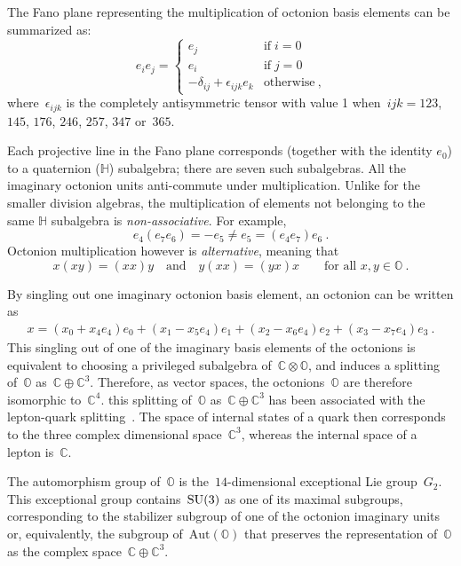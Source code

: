 \documentclass[reqno,11pt]{amsart}
\numberwithin{equation}{section}
\newcommand{\C}{\mathbb{C}}
\newcommand{\1}{\mbox{\rm 1 \hspace{-1.05 em} 1}}
\newcommand{\SU}{{\rm{SU}}}
\newcommand{\bb}[1]{\mathbb{#1}}
\begin{document}
\noindent
The Fano plane representing the multiplication of octonion basis elements can be summarized as:
\[ e_ie_j= \left\{ \begin{array}{cl}
        e_j&\textrm{if}\;i=0\\
        e_i&\textrm{if}\;j=0\\
        -\delta_{ij}+\epsilon_{ijk}e_k&\textrm{otherwise}\:,
    \end{array} \right. \]
where~$\epsilon_{ijk}$ is the completely antisymmetric tensor with value 1 when~$ijk = 123$, $145$, $176$,
$246$, $257$, $347$ or~$365$.

Each projective line in the Fano plane corresponds (together with the identity $e_0$) to a quaternion ($\bb{H}$) subalgebra; there are seven such subalgebras. All the imaginary octonion units anti-commute under multiplication. Unlike for the smaller division algebras, the multiplication of elements not belonging to the same $\bb{H}$ subalgebra is {\em{non-associative}}. For example,
\[ e_4(e_7e_6) = -e_5 \neq e_5 = (e_4e_7)e_6 \:. \]
Octonion multiplication however is {\em{alternative}}, meaning that
\[ x(xy) = (xx)y \quad\text{and} \quad y(xx) = (yx)x \qquad \text{for all~$x,y\in\bb{O}$}\:. \]

By singling out one imaginary octonion basis element, an octonion can be written as
\begin{eqnarray} \label{2.4}
x=(x_0+x_4e_4)e_0+(x_1-x_5e_4)e_1+(x_2-x_6e_4)e_2+(x_3-x_7e_4)e_3 \:.
\end{eqnarray}
This singling out of one of the imaginary basis elements of the octonions is equivalent to choosing a privileged subalgebra of~$\C \otimes \bb{O}$, and induces a splitting of~$\bb{O}$ as~$\bb{C}\oplus\bb{C}^3$. Therefore, as vector spaces, the octonions~$\bb{O}$ are therefore isomorphic to~$\bb{C}^4$. this splitting of~$\bb{O}$ as~$\bb{C}\oplus\bb{C}^3$ has been associated with the lepton-quark splitting~\cite{manogue1999dimensional}. The space of internal states of a quark then corresponds to the three complex dimensional space~$\bb{C}^3$, whereas the internal space of a lepton is~$\bb{C}$. 

The automorphism group of~$\bb{O}$ is the~$14$-dimensional exceptional Lie group~$G_2$. This exceptional group contains~$\SU(3)$ as one of its maximal subgroups, corresponding to the stabilizer subgroup of one of the octonion imaginary units or, equivalently, the subgroup of~$\text{Aut}(\bb{O})$ that preserves the representation of~$\bb{O}$ as the complex space~$\bb{C}\oplus \bb{C}^3$.
\end{document}
